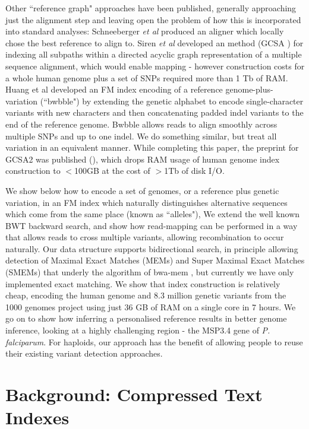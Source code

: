 \documentclass[runningheads,a4paper]{llncs}
\begin{document}
Other ``reference graph" approaches have been published, generally approaching just the alignment step and leaving open the problem of how this is incorporated into standard analyses: Schneeberger \textit{et al} \cite{korbinian} produced an aligner which locally chose the best reference to align to. Siren \textit{et al} developed an  method (GCSA \cite{siren1}) for indexing all subpaths within a directed acyclic graph representation of a multiple sequence alignment, which would enable mapping - however construction costs for a whole human genome plus a set of SNPs required more than 1 Tb of RAM. Huang et al \cite{huang} developed an FM index encoding of a reference genome-plus-variation (``bwbble") by extending the genetic alphabet to encode single-character variants with new characters and then concatenating padded indel variants to the end of the reference genome. Bwbble allows reads to align smoothly across multiple SNPs and up to one indel. We do something similar, but treat all variation in an equivalent manner.  While completing this paper, the preprint for GCSA2 was published (\cite{siren2}), which drops RAM usage of human genome index construction to $<$100GB at the cost of $>$1Tb of disk I/O.   

 We show below how to encode a set of genomes, or a reference plus  genetic variation, in an FM index which naturally distinguishes alternative sequences which come from the same place (known as ``alleles"), We extend the well known BWT backward search, and show how read-mapping can be performed in a way that allows reads to cross multiple variants, allowing recombination to occur naturally. Our data structure  supports bidirectional search, in principle allowing detection of Maximal Exact Matches (MEMs) and Super Maximal Exact Matches (SMEMs) that underly the algorithm of bwa-mem \cite{bwa}, but currently we have only implemented exact matching. We show that index construction is relatively cheap, encoding the human genome and 8.3 million genetic variants from the 1000 genomes project using just 36 GB of RAM on a single core in 7 hours. We go on to show how inferring a personalised reference results in better genome inference, looking at a highly challenging region - the MSP3.4 gene of \textit{P. falciparum}. For haploids, our approach has the benefit of allowing people to reuse their existing variant detection approaches. 
 


\section{Background: Compressed Text Indexes}
\end{document}
